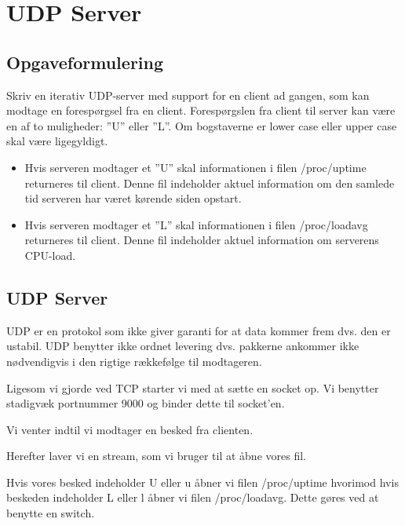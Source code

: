 \chapter{UDP Server}

\section{Opgaveformulering}

Skriv en iterativ UDP-server med support for en client ad gangen, som kan modtage
en forespørgsel fra en client.
Forespørgslen fra client til server kan være en af to muligheder: ”U” eller ”L”. Om
bogstaverne er lower case eller upper case skal være ligegyldigt.
\begin{itemize}
	\item Hvis serveren modtager et ”U” skal informationen i filen /proc/uptime
	returneres til client. Denne fil indeholder aktuel information om den samlede
	tid serveren har været kørende siden opstart.\\
	
	\item Hvis serveren modtager et ”L” skal informationen i filen /proc/loadavg
	returneres til client. Denne fil indeholder aktuel information om serverens
	CPU-load.
\end{itemize}

\section{UDP Server}
 
UDP er en protokol som ikke giver garanti for at data kommer frem dvs. den er ustabil. UDP benytter ikke ordnet levering dvs. pakkerne ankommer ikke nødvendigvis i den rigtige rækkefølge til modtageren. 

Ligesom vi gjorde ved TCP starter vi med at sætte en socket op. Vi benytter stadigvæk portnummer 9000 og binder dette til socket'en. 

Vi venter indtil vi modtager en besked fra clienten. 

Herefter laver vi en stream, som vi bruger til at åbne vores fil.

Hvis vores besked indeholder U eller u åbner vi filen /proc/uptime hvorimod hvis beskeden indeholder L eller l åbner vi filen /proc/loadavg. Dette gøres ved at benytte en switch. 


